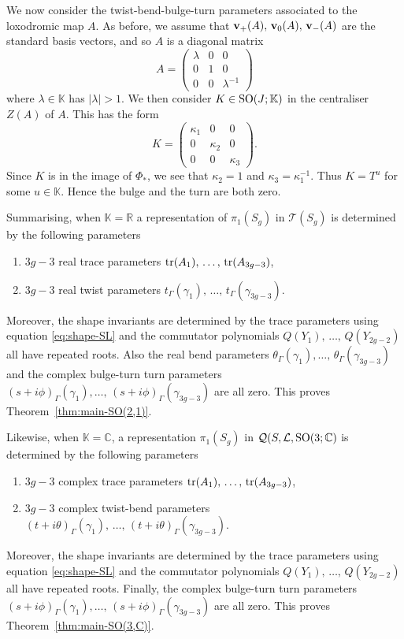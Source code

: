 \documentclass[11pt]{amsart}
\numberwithin{equation}{section}
\begin{document}
We now consider the twist-bend-bulge-turn parameters associated to the loxodromic map $A$. As before, we assume that 
${\bf v}_+(A),\,{\bf v}_0(A),\,{\bf v}_-(A)$ are the standard basis vectors, and so
$A$ is a diagonal matrix
$$
	A=\left(\begin{matrix} \lambda & 0 & 0 \\ 0 & 1 & 0 \\ 0 & 0 & \lambda^{-1}		
	\end{matrix}\right)
$$
where $\lambda\in{\mathbb K}$ has $|\lambda|>1$. 
We then consider $K\in{\rm SO}(J;{\mathbb K})$ in the centraliser $Z(A)$ of $A$. This has the form 
$$
K=\left(\begin{matrix} \kappa_1 & 0 & 0 \\ 0 & \kappa_2 & 0 \\ 0 & 0 & \kappa_3 \end{matrix}\right).
$$
Since $K$ is in the image of $\Phi_*$, we see that $\kappa_2=1$ and $\kappa_3=\kappa_1^{-1}$. Thus
$K=T^u$ for some $u\in{\mathbb K}$. Hence the bulge and the turn are both zero.

Summarising, when ${\mathbb K}={\mathbb R}$ a representation of $\pi_1(S_g)$ 
in ${\mathcal T}(S_g)$
is determined by the following parameters
\begin{enumerate}
\item[(1)] $3g-3$ real trace parameters ${\rm tr}(A_1),\,\ldots,\,{\rm tr}(A_{3g-3})$,
\item[(2)] $3g-3$ real twist parameters $t_\Gamma(\gamma_1),\,\ldots,\,t_\Gamma(\gamma_{3g-3})$.
\end{enumerate}
Moreover, the shape invariants are determined by the trace parameters using equation \eqref{eq:shape-SL} and the 
commutator polynomials $Q(Y_1),\,\ldots,\,Q(Y_{2g-2})$ all have repeated roots. Also the real bend parameters
$\theta_\Gamma(\gamma_1),\ldots,\,\theta_\Gamma(\gamma_{3g-3})$ and the complex bulge-turn 
turn parameters $(s+i\phi)_\Gamma(\gamma_1),\ldots,\,(s+i\phi)_\Gamma(\gamma_{3g-3})$ are all zero. 
This proves Theorem~\ref{thm:main-SO(2,1)}.

Likewise, when ${\mathbb K}={\mathbb C}$, a representation $\pi_1(S_g)$ 
in ${\mathcal Q}(S,{\mathcal L},{\rm SO}(3;{\mathbb C})$ is determined by the following parameters
\begin{enumerate}
\item[(1)] $3g-3$ complex trace parameters ${\rm tr}(A_1),\,\ldots,\,{\rm tr}(A_{3g-3})$,
\item[(2)] $3g-3$ complex twist-bend parameters $(t+i\theta)_\Gamma(\gamma_1),\,\ldots,\,(t+i\theta)_\Gamma(\gamma_{3g-3})$.
\end{enumerate}
Moreover, the shape invariants are determined by the trace parameters using equation \eqref{eq:shape-SL} and the 
commutator polynomials $Q(Y_1),\,\ldots,\,Q(Y_{2g-2})$ all have repeated roots. 
Finally, the complex bulge-turn turn parameters $(s+i\phi)_\Gamma(\gamma_1),\ldots,\,(s+i\phi)_\Gamma(\gamma_{3g-3})$ 
are all zero. 
This proves Theorem~\ref{thm:main-SO(3,C)}.
\end{document}

